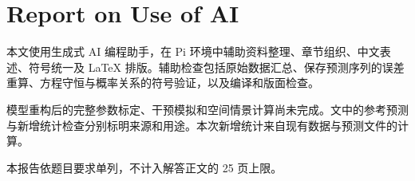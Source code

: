 \section*{Report on Use of AI}

本文使用生成式 AI 编程助手，在 Pi 环境中辅助资料整理、章节组织、中文表述、符号统一及 LaTeX 排版。辅助检查包括原始数据汇总、保存预测序列的误差重算、方程守恒与概率关系的符号验证，以及编译和版面检查。

模型重构后的完整参数标定、干预模拟和空间情景计算尚未完成。文中的参考预测与新增统计检查分别标明来源和用途。本次新增统计来自现有数据与预测文件的计算。

本报告依题目要求单列，不计入解答正文的 25 页上限。
